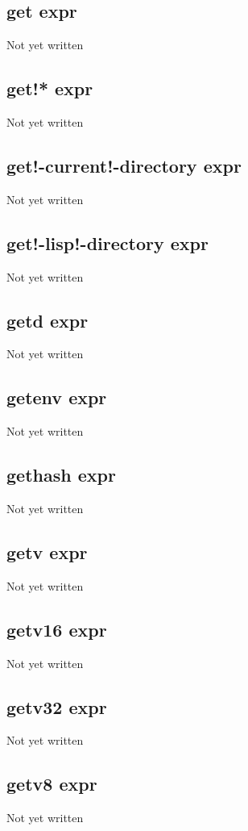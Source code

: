 \documentclass[a4paper,11pt]{article}
\begin{document}
\subsection{\ttfamily get expr}
Not yet written

\subsection{\ttfamily get!* expr}
Not yet written

\subsection{\ttfamily get!-current!-directory expr}
Not yet written

\subsection{\ttfamily get!-lisp!-directory expr}
Not yet written

\subsection{\ttfamily getd expr}
Not yet written

\subsection{\ttfamily getenv expr}
Not yet written

\subsection{\ttfamily gethash expr}
Not yet written

\subsection{\ttfamily getv expr}
Not yet written

\subsection{\ttfamily getv16 expr}
Not yet written

\subsection{\ttfamily getv32 expr}
Not yet written

\subsection{\ttfamily getv8 expr}
Not yet written
\end{document}
